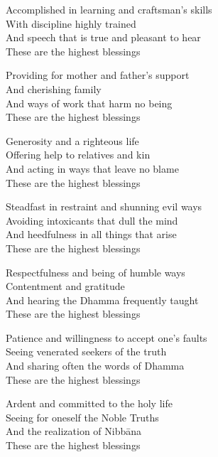 \bigskip

Accomplished in learning and craftsman's skills\\
With discipline highly trained\\
And speech that is true and pleasant to hear\\
These are the highest blessings

\bigskip

Providing for mother and father's support\\
And cherishing family\\
And ways of work that harm no being\\
These are the highest blessings

\bigskip

Generosity and a righteous life\\
Offering help to relatives and kin\\
And acting in ways that leave no blame\\
These are the highest blessings

\bigskip

Steadfast in restraint and shunning evil ways\\
Avoiding intoxicants that dull the mind\\
And heedfulness in all things that arise\\
These are the highest blessings

\bigskip

Respectfulness and being of humble ways\\
Contentment and gratitude\\
And hearing the Dhamma frequently taught\\
These are the highest blessings

\bigskip

Patience and willingness to accept one's faults\\
Seeing venerated seekers of the truth\\
And sharing often the words of Dhamma\\
These are the highest blessings

\bigskip

Ardent and committed
to the holy life\\
Seeing for oneself the Noble Truths\\
And the realization of Nibbāna\\
These are the highest blessings

\bigskip

